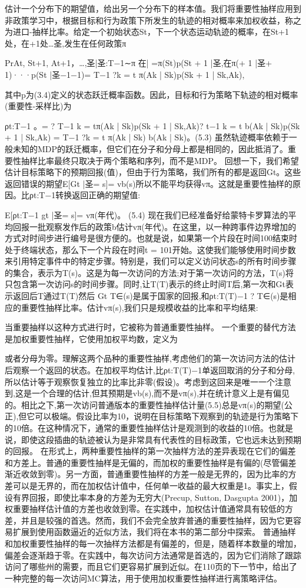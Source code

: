 估计一个分布下的期望值，给出另一个分布下的样本值。我们将重要性抽样应用到非政策学习中，根据目标和行为政策下所发生的轨迹的相对概率来加权收益，称之为进口-抽样比率。给定一个初始状态St，下一个状态运动轨迹的概率，在St+1处，在+1处…圣,发生在任何政策π

Pr{At, St+1, At+1，…,圣|圣:T−1∼π}
在| =π(St)p(St + 1 |圣,在π(+ 1 |圣+ 1)···p(St |圣−1−1)=
T−1 ?k = t
π(Ak | Sk)p(Sk + 1 | Sk,Ak),


其中p为(3.4)定义的状态跃迁概率函数。因此，目标和行为策略下轨迹的相对概率(重要性-采样比)为


ρt:T−1
。=
? T−1
k = tπ(Ak | Sk)p(Sk + 1 | Sk,Ak)? t−1 k = t b(Ak | Sk)p(Sk + 1 | Sk,Ak)
=
T−1 ?k = t
π(Ak | Sk)
b(Ak | Sk)。(5.3)
虽然轨迹概率依赖于一般未知的MDP的跃迁概率，但它们在分子和分母上都是相同的，因此抵消了。重要性抽样比率最终只取决于两个策略和序列，而不是MDP。
回想一下，我们希望估计目标策略下的预期回报(值)，但由于行为策略，我们所有的都是返回Gt。这些返回错误的期望E[Gt |圣= s]= vb(s)所以不能平均获得vπ。这就是重要性抽样的原因。比ρt:T−1转换返回正确的期望值:

E[ρt:T−1 gt |圣= s]= vπ(年代)。 					(5.4)
现在我们已经准备好给蒙特卡罗算法的平均回报一批观察发作后的政策b估计vπ(年代)。在这里，以一种跨事件边界增加的方式对时间步进行编号是很方便的。也就是说，如果第一个片段在时间100结束时处于终端状态，那么下一个片段在时间t = 101开始。这使我们能够使用时间步数来引用特定事件中的特定步骤。特别是，我们可以定义访问状态s的所有时间步骤的集合，表示为T(s)。这是为每一次访问的方法;对于第一次访问的方法，T(s)将只包含第一次访问s的时间步骤。同时,让T(T)表示的终止时间T后,第一次和Gt表示返回后T通过T(T)然后{ Gt } T∈(s)是属于国家的回报,和ρt:T(T)−1 ? T∈(s)是相应的重要性抽样比率。估计vπ(s),我们只是规模收益的比率和平均结果:

当重要抽样以这种方式进行时，它被称为普通重要性抽样。
一个重要的替代方法是加权重要性抽样，它使用加权平均数，定义为
 

或者分母为零。理解这两个品种的重要性抽样,考虑他们的第一次访问方法的估计后观察一个返回的状态。在加权平均估计,比ρt:T(T)−1单返回取消的分子和分母,所以估计等于观察恢复独立的比率比非零(假设)。考虑到这回来是唯一一个注意到,这是一个合理的估计,但其预期是vb(s),而不是vπ(s),并在统计意义上是有偏见的。相比之下,第一次访问普通版本的重要性抽样估计量(5.5)总是vπ(s)的期望(公正),但它可以极端。假设比率为10，说明在目标策略下观察到的轨迹是行为策略下的10倍。在这种情况下，通常的重要性抽样估计是观测到的收益的10倍。也就是说，即使这段插曲的轨迹被认为是非常具有代表性的目标政策，它也远未达到预期的回报。
在形式上，两种重要性抽样的第一次抽样方法的差异表现在它们的偏差和方差上。普通的重要性抽样是无偏的，而加权的重要性抽样是有偏的(尽管偏差渐近收敛到零)。另一方面，普通重要性抽样的方差一般是无界的，因为比率的方差可以是无界的，而在加权估计值中，任何单一收益的最大权重是1。事实上，假设有界回报，即使比率本身的方差为无穷大(Precup, Sutton, Dasgupta 2001)，加权重要抽样估计值的方差也收敛到零。在实践中，加权估计值通常具有较低的方差，并且是较强的首选。然而，我们不会完全放弃普通的重要性抽样，因为它更容易扩展到使用函数逼近的近似方法，我们将在本书的第二部分中探索。
普通抽样和加权重要性抽样的每一次抽样方法都是有偏差的，但是，随着样本数量的增加，偏差会逐渐趋于零。在实践中，每次访问方法通常是首选的，因为它们消除了跟踪访问了哪些州的需要，而且它们更容易扩展到近似。在110页的下一节中，给出了一种完整的每一次访问MC算法，用于使用加权重要性抽样进行离策略评估。

